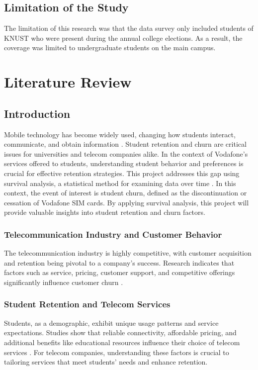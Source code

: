 \documentclass[doublespacing]{report} [12px]%
\begin{document}
\section{Limitation of the Study}

The limitation of this research was that the data survey only included students of KNUST who were present during the annual college elections. As a result, the coverage was limited to undergraduate students on the main campus.

\newpage
\chapter{Literature Review}


\section{Introduction}
Mobile technology has become widely used, changing how students interact, communicate, and obtain information \cite{Alqatani2020}. Student retention and churn are critical issues for universities and telecom companies alike. In the context of Vodafone's services offered to students, understanding student behavior and preferences is crucial for effective retention strategies. This project addresses this gap using survival analysis, a statistical method for examining data over time \cite{BoxSteffensmeier2020}. In this context, the event of interest is student churn, defined as the discontinuation or cessation of Vodafone SIM cards. By applying survival analysis, this project will provide valuable insights into student retention and churn factors.

\subsection{Telecommunication Industry and Customer Behavior}
The telecommunication industry is highly competitive, with customer acquisition and retention being pivotal to a company's success. Research indicates that factors such as service, pricing, customer support, and competitive offerings significantly influence customer churn \cite{Lai2021}.

\subsection{Student Retention and Telecom Services}
Students, as a demographic, exhibit unique usage patterns and service expectations. Studies show that reliable connectivity, affordable pricing, and additional benefits like educational resources influence their choice of telecom services \cite{SmithBrown2020}. For telecom companies, understanding these factors is crucial to tailoring services that meet students’ needs and enhance retention.
\end{document}
